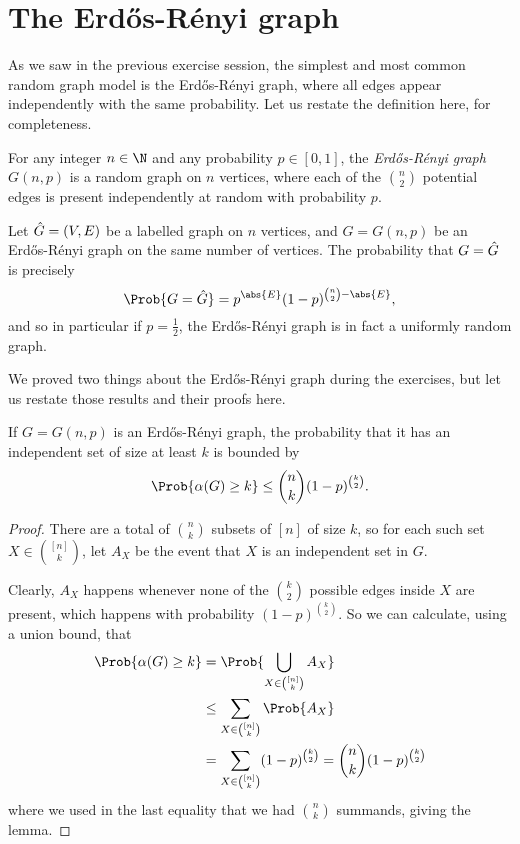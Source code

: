 \documentclass[nobib]{tufte-handout}
\begin{document}
\section{The Erd\H{o}s-Rényi graph}

As we saw in the previous exercise session, the simplest and most common random graph model is the Erd\H{o}s-Rényi graph, where all edges appear independently with the same probability. Let us restate the definition here, for completeness.

\begin{definition}
  For any integer $n \in \N$ and any probability $p \in [0,1]$, the \emph{Erd\H{o}s-Rényi graph} $G(n,p)$ is a random graph on $n$ vertices, where each of the $\binom{n}{2}$ potential edges is present independently at random with probability $p$.
\end{definition}

\begin{proposition}
  Let $\Hat G = (V,E)$ be a labelled graph on $n$ vertices, and $G = G(n,p)$ be an Erd\H{o}s-Rényi graph on the same number of vertices. The probability that $G = \Hat G$ is precisely
  $$\Prob{G = \Hat G} = p^{\abs{E}}(1-p)^{\binom{n}{2} - \abs{E}},$$
  and so in particular if $p = \frac{1}{2}$, the Erd\H{o}s-Rényi graph is in fact a uniformly random graph.
\end{proposition}

We proved two things about the Erd\H{o}s-Rényi graph during the exercises, but let us restate those results and their proofs here.

\begin{lemma}
  If $G = G(n,p)$ is an Erd\H{o}s-Rényi graph, the probability that it has an independent set of size at least $k$ is bounded by
  $$\Prob{\alpha(G) \geq k} \leq \binom{n}{k}(1-p)^{\binom{k}{2}}.$$

  \begin{proof}
    There are a total of $\binom{n}{k}$ subsets of $[n]$ of size $k$, so for each such set $X \in \binom{[n]}{k}$, let $A_X$ be the event that $X$ is an independent set in $G$.

    Clearly, $A_X$ happens whenever none of the $\binom{k}{2}$ possible edges inside $X$ are present, which happens with probability $(1-p)^{\binom{k}{2}}$. So we can calculate, using a union bound, that
    \begin{align*}
      \Prob{\alpha(G) \geq k} &= \Prob{\bigcup_{X \in \binom{[n]}{k}} A_X}\\
      &\leq \sum_{X \in \binom{[n]}{k}} \Prob{A_X}\\
      &= \sum_{X \in \binom{[n]}{k}} (1-p)^{\binom{k}{2}} = \binom{n}{k}(1-p)^{\binom{k}{2}}
    \end{align*}
    where we used in the last equality that we had $\binom{n}{k}$ summands, giving the lemma.
  \end{proof}
\end{lemma}
\end{document}
